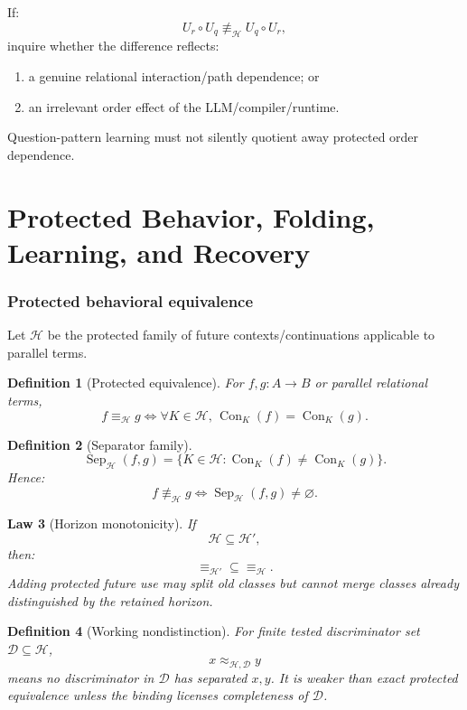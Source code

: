 \documentclass[11pt,oneside]{article}
\newtheorem{definition}{Definition}[section]
\newtheorem{law}[definition]{Law}
\newcommand{\Con}{\operatorname{Con}}
\newcommand{\Sep}{\operatorname{Sep}}
\begin{document}
If:
\[
\boxed{
U_r\circ U_q
\not\equiv_{\mathcal H}
U_q\circ U_r,
}
\]
inquire whether the difference reflects:
\begin{enumerate}
\item a genuine relational interaction/path dependence; or
\item an irrelevant order effect of the LLM/compiler/runtime.
\end{enumerate}

Question-pattern learning must not silently quotient away protected order dependence.


\part{Protected Behavior, Folding, Learning, and Recovery}

\section{Protected behavioral equivalence}

Let \(\mathcal H\) be the protected family of future contexts/continuations applicable to parallel terms.

\begin{definition}[Protected equivalence]
For \(f,g:A\to B\) or parallel relational terms,
\[
\boxed{
f\equiv_{\mathcal H}g
\iff
\forall K\in\mathcal H,\,
\Con_K(f)=\Con_K(g).
}
\]
\end{definition}

\begin{definition}[Separator family]
\[
\boxed{
\Sep_{\mathcal H}(f,g)
=
\{
K\in\mathcal H:
\Con_K(f)\neq\Con_K(g)
\}.
}
\]
Hence:
\[
f\not\equiv_{\mathcal H}g
\iff
\Sep_{\mathcal H}(f,g)\neq\varnothing.
\]
\end{definition}

\begin{law}[Horizon monotonicity]
If
\[
\mathcal H\subseteq\mathcal H',
\]
then:
\[
\boxed{
\equiv_{\mathcal H'}
\subseteq
\equiv_{\mathcal H}.
}
\]
Adding protected future use may split old classes but cannot merge classes already distinguished by the retained horizon.
\end{law}

\begin{definition}[Working nondistinction]
For finite tested discriminator set \(\mathcal D\subseteq\mathcal H\),
\[
x\approx_{\mathcal H,\mathcal D}y
\]
means no discriminator in \(\mathcal D\) has separated \(x,y\).  It is weaker than exact protected equivalence unless the binding licenses completeness of \(\mathcal D\).
\end{definition}
\end{document}
